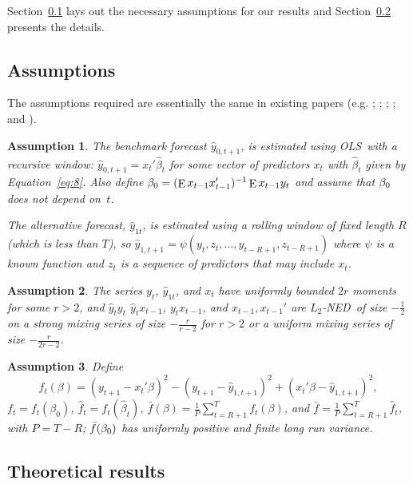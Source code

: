 \documentclass[12pt,fleqn]{article}
\newtheorem{asmp}{Assumption}
\theoremstyle{definition}
\DeclareMathOperator{\E}{E}
\newcommand{\btrue}[1][]{\if#1*\hat\beta_{T+1}\else\beta_0\fi}
\newcommand{\osum}[1]{\sum_{#1=R+1}^T}
\newcommand{\oavg}[1]{\tfrac{1}{P} \osum{#1}}
\newcommand{\ned}{NED}
\newcommand{\ols}{OLS}
\begin{document}
Section~\ref{sec:1a} lays out the necessary assumptions for our
results and Section~\ref{sec:1b} presents the details.

\subsection{Assumptions}
\label{sec:1a}

The assumptions required are essentially the same in existing papers
(e.g. \citealp{Wes:96}; \citealp{WeM:98}; \citealp{Mcc:00};
\citealp{GiW:06}; and \citealp{ClW:06,ClW:07}).

\begin{asmp}\label{a1}%
  The benchmark forecast $\hat{y}_{0,t+1}$, is estimated using \ols\
  with a recursive window: $\hat{y}_{0,t+1} = x_t'\hat{\beta}_t$ for
  some vector of predictors $x_t$ with $\hat{\beta}_t$ given by
  Equation~\eqref{eq:8}.  Also define $\btrue = (\E x_{t-1}
  x_{t-1}')^{-1} \E x_{t-1} y_t$ and assume that $\btrue$ does not
  depend on~$t$.

  The alternative forecast, $\hat{y}_{1t}$, is estimated using a
  rolling window of fixed length $R$ (which is less than $T$), so
  $\hat{y}_{1,t+1} = \psi(y_t,z_t,\dots,y_{t-R+1}, z_{t-R+1})$ where
  $\psi$ is a known function and $z_t$ is a sequence of predictors
  that may include $x_t$.
\end{asmp}

\begin{asmp}\label{a3}%
  The series $y_t$, $\hat{y}_{1t}$, and $x_t$ have uniformly bounded
  $2 r$ moments for some $r > 2$, and $\hat y_t y_t$ $\hat y_t
  x_{t-1}$, $y_t x_{t-1}$, and $x_{t-1}, x_{t-1}'$ are $L_2$-\ned\ of
  size $-\frac12$ on a strong mixing series of size $-\frac{r}{r-2}$
  for $r>2$ or a uniform mixing series of size $-\frac{r}{2r-2}$.
\end{asmp}

\begin{asmp}\label{a4}%
  Define \[f_t(\beta) = (y_{t+1} - x_t'\beta)^2 - (y_{t+1} -
  \hat{y}_{1,t+1})^2 + (x_t'\beta - \hat{y}_{1,t+1})^2,\] $f_t =
  f_t(\beta_0)$, $\hat f_t = f_t(\hat\beta_t)$, $\bar{f}(\beta) =
  \oavg{t} f_t(\beta)$, and $\bar f = \tfrac1P \sum_{t=R+1}^{T} \hat
  f_t$, with $P = T - R$; $\bar f(\btrue)$ has uniformly positive and
  finite long run variance.
\end{asmp}

\subsection{Theoretical results}
\label{sec:1b}
\end{document}
